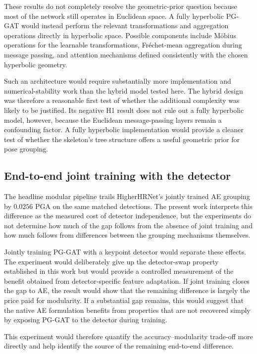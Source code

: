 These results do not completely resolve the geometric-prior question
because most of the network still operates in Euclidean space.
A fully hyperbolic PG-GAT would instead perform the relevant
transformations and aggregation operations directly in hyperbolic space.
Possible components include M\"obius operations for the learnable
transformations,
Fr\'echet-mean aggregation during message passing,
and attention mechanisms defined consistently with the chosen hyperbolic
geometry.

Such an architecture would require substantially more implementation and
numerical-stability work than the hybrid model tested here.
The hybrid design was therefore a reasonable first test of whether the
additional complexity was likely to be justified.
Its negative H1 result does not rule out a fully hyperbolic model,
however, because the Euclidean message-passing layers remain a
confounding factor.
A fully hyperbolic implementation would provide a cleaner test of
whether the skeleton's tree structure offers a useful geometric prior
for pose grouping.

\subsection{End-to-end joint training with the detector}
\label{sec_conc_future_jointtrain}

The headline modular pipeline trails HigherHRNet's jointly trained AE
grouping by $0.0256$ PGA on the same matched detections.
The present work interprets this difference as the measured cost of
detector independence,
but the experiments do not determine how much of the gap follows from
the absence of joint training and how much follows from differences
between the grouping mechanisms themselves.

Jointly training PG-GAT with a keypoint detector would separate these
effects.
The experiment would deliberately give up the detector-swap property
established in this work
but would provide a controlled measurement of the benefit obtained from
detector-specific feature adaptation.
If joint training closes the gap to AE,
the result would show that the remaining difference is largely the price
paid for modularity.
If a substantial gap remains,
this would suggest that the native AE formulation benefits from
properties that are not recovered simply by exposing PG-GAT to the
detector during training.

This experiment would therefore quantify the accuracy--modularity
trade-off more directly and help identify the source of the remaining
end-to-end difference.

